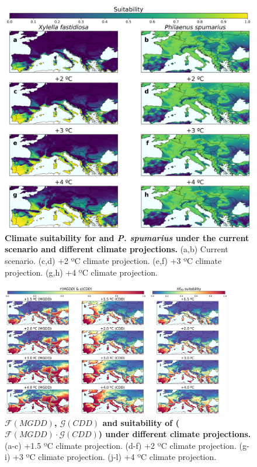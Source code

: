 \begin{figure}[H]
    \centering
    \includegraphics[width=\textwidth]{Figures/Xf_Ps_suitability.pdf}
    \caption[Climate suitability for \xf{} and \textit{P.
            spumarius} under present and future climate
        conditions.]{\textbf{Climate suitability for \xf{} and \textit{P.
                spumarius} under the current scenario and different climate
            projections.} (a,b)
        Current scenario. (c,d) +2 ºC climate projection. (e,f) +3 ºC climate
        projection. (g,h) +4 ºC climate projection.}
    \label{fig:Xf_Ps_suitability}
\end{figure}

\begin{figure}[H]
    \centering

    \includegraphics[width=0.9\textwidth]{Figures/Xf_suitability_explainability.pdf}
    \caption[$\mathcal{F}(MGDD)$, $\mathcal{G}(CDD)$ and
        suitability of \xf{} under different climate
        projections]{\textbf{$\mathcal{F}(MGDD)$,
            $\mathcal{G}(CDD)$ and
            suitability of \xf{} ($\mathcal{F}(MGDD)\cdot\mathcal{G}(CDD)$)
            under different
            climate projections.} (a-c) +1.5 ºC climate projection. (d-f) +2 ºC
        climate
        projection. (g-i) +3 ºC climate projection. (j-l) +4 ºC climate
        projection.}
    \label{fig:Xf_suitability_explainability}
\end{figure}

